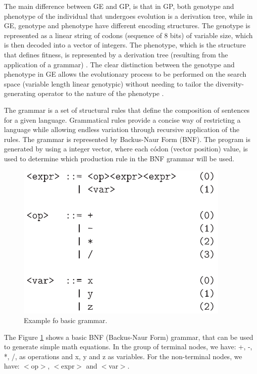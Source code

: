 \documentclass[journal]{IEEEtran}
\begin{document}
The main difference between GE and GP, is that in GP, both genotype and phenotype of the individual that undergoes evolution is a derivation tree, while in GE, genotype and phenotype have different encoding structures. The genotype is represented as a linear string of codons (sequence of 8 bits) of variable size, which is then decoded into a vector of integers. The phenotype, which is the structure that defines fitness, is represented by a derivation tree (resulting from the application of a grammar) \cite{cerri2013grammatical}. The clear distinction between the genotype and phenotype in GE allows the evolutionary process to be performed on the search space (variable length linear genotypic) without needing to tailor the diversity-generating operator to the nature of the phenotype \cite{sabar2013grammatical}.

The grammar is a set of structural rules that define the composition of sentences for a given language. Grammatical rules provide a concise way of restricting a language while allowing endless variation through recursive application of the rules\cite{byrne2015optimising}. The grammar is represented by Backus-Naur Form (BNF). The program is generated by using a integer vector, where each códon (vector position) value, is used to determine which production rule in the BNF grammar will be used.

\begin{figure}[!htb]
	\centering
	\includegraphics[scale=.8]{figures/grammar.png}
	\caption{Example fo basic grammar. \cite{ryan1998grammatical}}
	\label{fig:grammar}
\end{figure}

The Figure \ref{fig:grammar} shows a basic BNF (Backus-Naur Form) grammar, that can be used to generate simple math equations. In the group of terminal nodes, we have: +, -, *, /, as operations and x, y and z as variables. For the non-terminal nodes, we have: $<$op$>$, $<$expr$>$ and $<$var$>$.
\end{document}
